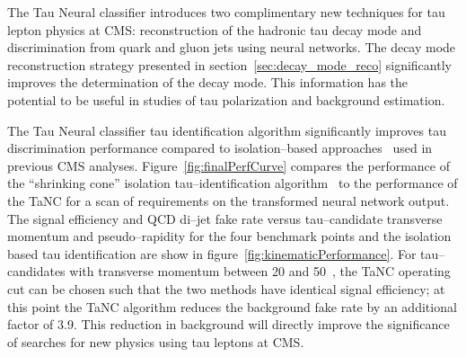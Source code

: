 The Tau Neural classifier introduces two complimentary new techniques for tau
lepton physics at CMS: reconstruction of the hadronic tau decay mode and
discrimination from quark and gluon jets using neural networks.  The decay mode
reconstruction strategy presented in section~\ref{sec:decay_mode_reco}
significantly improves the determination of the decay mode. This information has
the potential to be useful in studies of tau polarization and background
estimation.

The Tau Neural classifier tau identification algorithm significantly improves
tau discrimination performance compared to isolation--based
approaches~\cite{CMS-PAS-PFT-08-001} used in previous CMS analyses.
Figure~\ref{fig:finalPerfCurve} compares the performance of the ``shrinking
cone'' isolation tau--identification algorithm~\cite{CMS-PAS-PFT-08-001} to the
performance of the TaNC for a scan of requirements on the transformed neural
network output.  The signal efficiency and QCD di--jet fake rate versus
tau--candidate transverse momentum and pseudo--rapidity for the four benchmark
points and the isolation based tau identification are show in
figure~\ref{fig:kinematicPerformance}.  For tau--candidates with transverse
momentum between 20 and 50~\GeVc, the TaNC operating cut can be chosen such that
the two methods have identical signal efficiency; at this point the TaNC
algorithm reduces the background fake rate by an additional factor of 3.9.  This
reduction in background will directly improve the significance of searches for
new physics using tau leptons at CMS.

